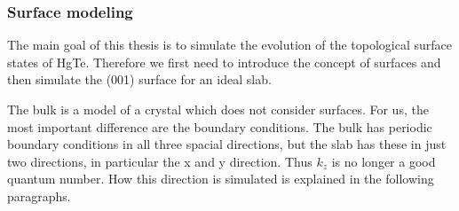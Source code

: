 	\subsubsection{Surface modeling} \label{surface_modeling}
%		
		The main goal of this thesis is to simulate the evolution of the topological surface states of HgTe. Therefore we first need to introduce the concept of surfaces and then simulate the (001) surface for an ideal slab. 
		
		The bulk is a model of a crystal which does not consider surfaces. For us, the most important difference are the boundary conditions. The bulk has periodic boundary conditions in all three spacial directions, but the slab has these in just two directions, in particular the x and y direction. Thus $k_z$ is no longer a good quantum number.  How this direction is simulated is explained in the following paragraphs. 
